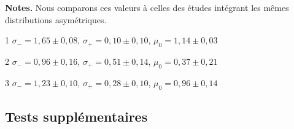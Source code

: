 \documentclass[../main/main.tex]{subfiles}
\begin{document}
\begin{table}
    \centering
    \caption[Paramètres de meilleur ajustement pour notre modélisation
    asymétrique par échantillon de la distribution d'étirement
    sous-jacente]{Paramètres de meilleur ajustement pour notre modélisation
    asymétrique par échantillon de la distribution d'étirement sous-jacente.}
    \label{tab:bbc}
    \begin{threeparttable}
        \begin{tablenotes}[flushleft]
            \item\small \textbf{\hspace{-3,2pt}Notes.} Nous comparons ces
                valeurs à celles des études intégrant les mêmes distributions
                asymétriques.
            \item [1]\small $\sigma_{-} = 1,65 \pm 0,08$, $\sigma_{+} = 0,10 \pm
                0,10$, $\mu_0 = 1,14 \pm 0,03$ \citep[Tableau~1,][]{scolnic2016}
            \item [2]\small $\sigma_{-} = 0,96 \pm 0,16$, $\sigma_{+} = 0,51 \pm
                0,14$, $\mu_0 = 0,37 \pm 0,21$ \citep[Tableau~3,][]{scolnic2018}
            \item [3]\small $\sigma_{-} = 1,23 \pm 0,10$, $\sigma_{+} = 0,28 \pm
                0,10$, $\mu_0 = 0,96 \pm 0,14$ \citep[Tableau~1,][]{scolnic2016}
        \end{tablenotes}
    \end{threeparttable}
\end{table}

\subsection{Tests supplémentaires}\label{ssec:testsupp}
\end{document}
